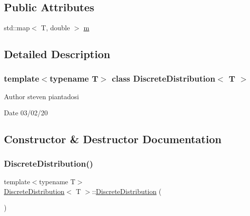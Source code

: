 \subsection*{Public Attributes}
\begin{DoxyCompactItemize}
\item 
std\+::map$<$ T, double $>$ \hyperlink{class_discrete_distribution_a72a09b5b79a5bf0c55f780b9a81271fb}{m}
\end{DoxyCompactItemize}


\subsection{Detailed Description}
\subsubsection*{template$<$typename T$>$\newline
class Discrete\+Distribution$<$ T $>$}

\begin{DoxyAuthor}{Author}
steven piantadosi 
\end{DoxyAuthor}
\begin{DoxyDate}{Date}
03/02/20 
\end{DoxyDate}


\subsection{Constructor \& Destructor Documentation}
\mbox{\label{class_discrete_distribution_a8ffb7c55f85cf42af7aec6deb97ec4ab}} 
\subsubsection{\texorpdfstring{Discrete\+Distribution()}{DiscreteDistribution()}}
{\footnotesize\ttfamily template$<$typename T$>$ \\
\hyperlink{class_discrete_distribution}{Discrete\+Distribution}$<$ T $>$\+::\hyperlink{class_discrete_distribution}{Discrete\+Distribution} (\begin{DoxyParamCaption}{ }\end{DoxyParamCaption})\hspace{0.3cm}{\ttfamily [inline]}}



